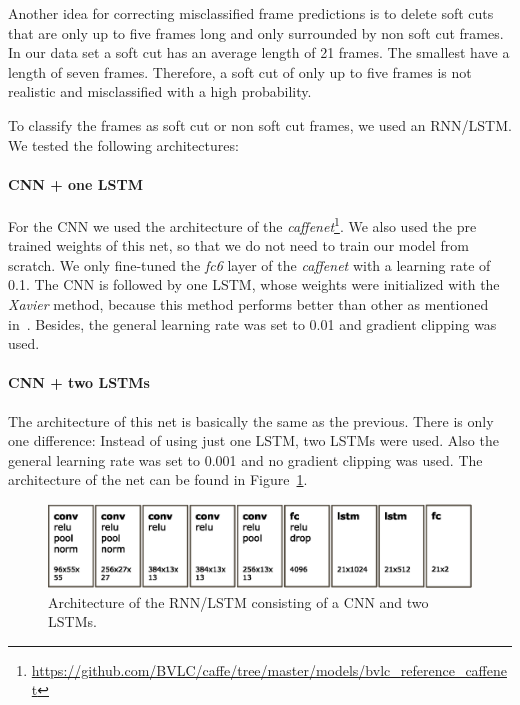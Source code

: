 Another idea for correcting misclassified frame predictions is to delete soft cuts that are only up to five frames long and only surrounded by non soft cut frames.
In our data set a soft cut has an average length of 21 frames.
The smallest have a length of seven frames.
Therefore, a soft cut of only up to five frames is not realistic and misclassified with a high probability.

To classify the frames as soft cut or non soft cut frames, we used an RNN/LSTM.
We tested the following architectures:

\paragraph{CNN + one LSTM}
For the CNN we used the architecture of the \textit{caffenet}\footnote{\url{https://github.com/BVLC/caffe/tree/master/models/bvlc_reference_caffenet}}.
We also used the pre trained weights of this net, so that we do not need to train our model from scratch.
We only fine-tuned the \textit{fc6} layer of the \textit{caffenet} with a learning rate of 0.1.
The CNN is followed by one LSTM, whose weights were initialized with the \textit{Xavier} method, because this method performs better than other as mentioned in~\cite{glorot2010understanding}.
Besides, the general learning rate was set to 0.01 and gradient clipping was used.

\paragraph{CNN + two LSTMs}
The architecture of this net is basically the same as the previous.
There is only one difference: Instead of using just one LSTM, two LSTMs were used.
Also the general learning rate was set to 0.001 and no gradient clipping was used.
The architecture of the net can be found in Figure~\ref{fig:net_architecture}.
\begin{figure}[!htb]
	\centering
	\includegraphics[scale=.5]{images/net_architecture.eps}
	\caption{Architecture of the RNN/LSTM consisting of a CNN and two LSTMs.}
	\label{fig:net_architecture}
\end{figure}

